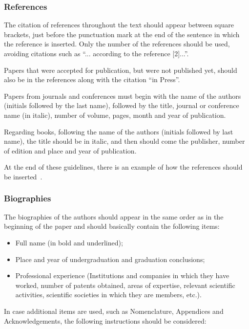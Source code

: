 \documentclass[english]{cobep-spec}
\begin{document}
\subsubsection{References}

The citation of references throughout the text should appear between square brackets, just before the punctuation mark at the end of the sentence in which the reference is inserted. Only the number of the references should be used, avoiding citations such as ``... according to the reference [2]...''.

Papers that were accepted for publication, but were not published yet, should also be in the references along with the citation ``in Press''.

Papers from journals and conferences must begin with the name of the authors (initials followed by the last name), followed by the title, journal or conference name (in italic), number of volume, pages, month and year of publication. 

Regarding books, following the name of the authors (initials followed by last name), the title should be in italic, and then should come the publisher, number of edition and place and year of publication.

At the end of these guidelines, there is an example of how the references should be inserted~\cite{refbib1,refbib2,refbib3,refbib4,refbib5,refbib6,refbib7,refbib8}.


\subsubsection{Biographies}

The biographies of the authors should appear in the same order as in the beginning of the paper and should basically contain the following items:
\begin{itemize}
	\item Full name (in bold and underlined);
	\item Place and year of undergraduation and graduation conclusions;
	\item Professional experience (Institutions and companies in which they have worked, number of patents obtained, areas of expertise, relevant scientific activities, scientific societies in which they are members, etc.). \newline
\end{itemize}

In case additional items are used, such as Nomenclature, Appendices and Acknowledgements, the following instructions should be considered:
\end{document}
